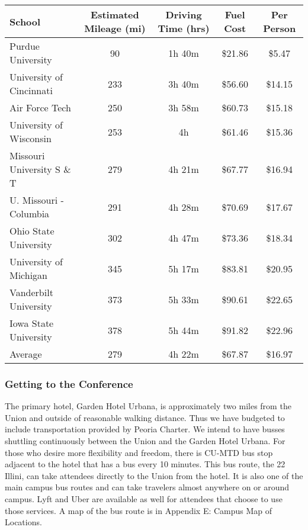 \begin{center}
   \begin{tabular}{lcccc}
   \hline\hline
   \textbf{School}&\textbf{Estimated Mileage (mi)}&\textbf{Driving Time (hrs)}&\textbf{Fuel Cost}&\textbf{Per Person}\\
   \hline\hline
    Purdue University&90&1h 40m&\$21.86&\$5.47\\
    University of Cincinnati&233& 3h 40m&\$56.60&\$14.15\\
    Air Force Tech &250&3h 58m&\$60.73&\$15.18\\
    University of Wisconsin&253&4h&\$61.46&\$15.36\\
    Missouri University S \& T &279&4h 21m&\$67.77&\$16.94\\
    U. Missouri - Columbia&291&4h 28m&\$70.69&\$17.67\\
    Ohio State University&302&4h 47m&\$73.36&\$18.34\\
    University of Michigan&345&5h 17m&\$83.81&\$20.95\\
    Vanderbilt University&373&5h 33m&\$90.61&\$22.65\\
    Iowa State University&378&5h 44m&\$91.82&\$22.96\\
    \hline
    Average&279&4h 22m&\$67.87&\$16.97

    \end{tabular} 
\end{center}

\subsubsection{Getting to the Conference}
The primary hotel, Garden Hotel Urbana, is approximately two miles from the Union and outside of reasonable walking distance. Thus we have budgeted to include transportation provided by Peoria Charter. We intend to have busses shuttling continuously between the Union and the Garden Hotel Urbana. For those who desire more flexibility and freedom, there is CU-MTD bus stop adjacent to the hotel that has a bus every 10 minutes. This bus route, the 22 Illini, can take attendees directly to the Union from the hotel. It is also one of the main campus bus routes and can take travelers almost anywhere on or around campus. Lyft and Uber are available as well for attendees that choose to use those services. A map of the bus route is in Appendix E: Campus Map of Locations.
